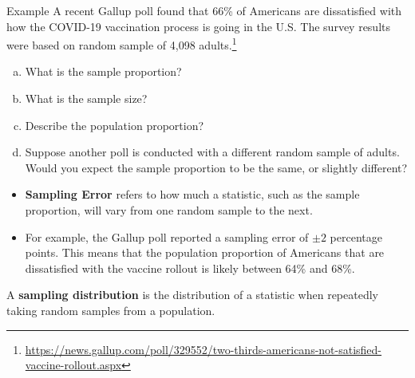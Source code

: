 \documentclass[11pt]{beamer}
\begin{document}
\begin{frame}{Example}
\small
A recent Gallup poll found that 66\% of Americans are dissatisfied with how the COVID-19 vaccination process is going in the U.S.  The survey results were based on random sample of 4,098 adults.\footnote{\tiny \url{https://news.gallup.com/poll/329552/two-thirds-americans-not-satisfied-vaccine-rollout.aspx}}
\begin{enumerate}[(a)]
\item What is the sample proportion?
\vspace{0.5cm}
\item What is the sample size?
\vspace{0.5cm}
\item Describe the population proportion?
\vspace{1.25cm}
\item Suppose another poll is conducted with a different random sample of adults.  Would you expect the sample proportion to be the same, or slightly different?
\vspace{0.5cm}
\end{enumerate}
\end{frame}

\begin{frame}
\begin{itemize}
\item \textbf{Sampling Error} refers to how much a statistic, such as the sample proportion, will vary from one random sample to the next.
\vspace{10pt}
\item For example, the Gallup poll reported a sampling error of $\pm 2$ percentage points.  This means that the population proportion of Americans that are dissatisfied with the vaccine rollout is likely between 64\% and 68\%. 
\end{itemize}
\end{frame}

\begin{frame}
\vspace{-3.5cm}
A \textbf{sampling distribution} is the distribution of a statistic when repeatedly taking random samples from a population.

\end{frame}

\begin{frame}
\end{frame}
\end{document}
